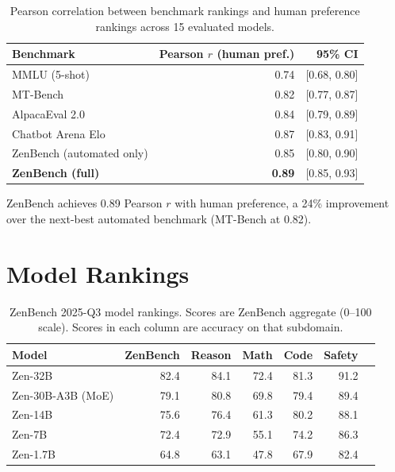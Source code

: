\documentclass[11pt,a4paper]{article}
\begin{document}
\begin{table}[H]
\centering
\caption{Pearson correlation between benchmark rankings and human preference rankings
across 15 evaluated models.}
\begin{tabular}{lrr}
\toprule
\textbf{Benchmark} & \textbf{Pearson $r$ (human pref.)} & \textbf{95\% CI} \\
\midrule
MMLU (5-shot)                   & 0.74 & [0.68, 0.80] \\
MT-Bench                        & 0.82 & [0.77, 0.87] \\
AlpacaEval 2.0                  & 0.84 & [0.79, 0.89] \\
Chatbot Arena Elo               & 0.87 & [0.83, 0.91] \\
ZenBench (automated only)       & 0.85 & [0.80, 0.90] \\
\textbf{ZenBench (full)}        & \textbf{0.89} & [0.85, 0.93] \\
\bottomrule
\end{tabular}
\label{tab:human_corr}
\end{table}

ZenBench achieves 0.89 Pearson $r$ with human preference, a 24\% improvement over
the next-best automated benchmark (MT-Bench at 0.82).

\section{Model Rankings}
\label{sec:rankings}

\begin{table}[H]
\centering
\caption{ZenBench 2025-Q3 model rankings. Scores are ZenBench aggregate (0--100 scale).
Scores in each column are accuracy on that subdomain.}
\begin{tabular}{lrrrrrr}
\toprule
\textbf{Model} & \textbf{ZenBench} & \textbf{Reason} & \textbf{Math} & \textbf{Code} & \textbf{Safety} \\
\midrule
Zen-32B          & 82.4 & 84.1 & 72.4 & 81.3 & 91.2 \\
Zen-30B-A3B (MoE) & 79.1 & 80.8 & 69.8 & 79.4 & 89.4 \\
Zen-14B          & 75.6 & 76.4 & 61.3 & 80.2 & 88.1 \\
Zen-7B           & 72.4 & 72.9 & 55.1 & 74.2 & 86.3 \\
Zen-1.7B         & 64.8 & 63.1 & 47.8 & 67.9 & 82.4 \\
\bottomrule
\end{tabular}
\label{tab:rankings}
\end{table}
\end{document}
